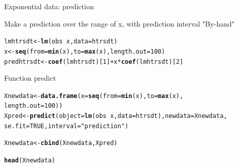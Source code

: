 \documentclass[10pt]{beamer}\usepackage[]{graphicx}\usepackage[]{color}
\makeatletter
\newcommand{\hlnum}[1]{\textcolor[rgb]{0.686,0.059,0.569}{#1}}%
\newcommand{\hlstr}[1]{\textcolor[rgb]{0.192,0.494,0.8}{#1}}%
\newcommand{\hlopt}[1]{\textcolor[rgb]{0,0,0}{#1}}%
\newcommand{\hlstd}[1]{\textcolor[rgb]{0.345,0.345,0.345}{#1}}%
\newcommand{\hlkwb}[1]{\textcolor[rgb]{0.69,0.353,0.396}{#1}}%
\newcommand{\hlkwc}[1]{\textcolor[rgb]{0.333,0.667,0.333}{#1}}%
\newcommand{\hlkwd}[1]{\textcolor[rgb]{0.737,0.353,0.396}{\textbf{#1}}}%
\newenvironment{kframe}{%
 \def\at@end@of@kframe{}%
 \ifinner\ifhmode%
  \def\at@end@of@kframe{\end{minipage}}%
  \begin{minipage}{\columnwidth}%
 \fi\fi%
 \def\FrameCommand##1{\hskip\@totalleftmargin \hskip-\fboxsep
 \colorbox{shadecolor}{##1}\hskip-\fboxsep
     \hskip-\linewidth \hskip-\@totalleftmargin \hskip\columnwidth}%
 \MakeFramed {\advance\hsize-\width
   \@totalleftmargin\z@ \linewidth\hsize
   \@setminipage}}%
 {\par\unskip\endMakeFramed%
 \at@end@of@kframe}
\newenvironment{knitrout}{}{} %
\makeatother
\begin{document}
\begin{frame}[fragile]{Exponential data: prediction}

Make a prediction over the range of x, with prediction interval
\pause
"By-hand"
\begin{knitrout}\small
{}\color{fgcolor}\begin{kframe}
\begin{alltt}
\hlstd{lmhtrsdt} \hlkwb{<-} \hlkwd{lm}\hlstd{(obs} \hlopt{~} \hlstd{x,} \hlkwc{data}\hlstd{=htrsdt)}
\hlstd{x} \hlkwb{<-} \hlkwd{seq}\hlstd{(}\hlkwc{from}\hlstd{=}\hlkwd{min}\hlstd{(x),} \hlkwc{to}\hlstd{=}\hlkwd{max}\hlstd{(x),} \hlkwc{length.out} \hlstd{=} \hlnum{100}\hlstd{)}
\hlstd{predhtrsdt} \hlkwb{<-} \hlkwd{coef}\hlstd{(lmhtrsdt)[}\hlnum{1}\hlstd{]} \hlopt{+} \hlstd{x} \hlopt{*} \hlkwd{coef}\hlstd{(lmhtrsdt)[}\hlnum{2}\hlstd{]}
\end{alltt}
\end{kframe}
\end{knitrout}

\pause
Function predict
\begin{knitrout}\small
{}\color{fgcolor}\begin{kframe}
\begin{alltt}
\hlstd{Xnewdata} \hlkwb{<-} \hlkwd{data.frame}\hlstd{(}\hlkwc{x}\hlstd{=}\hlkwd{seq}\hlstd{(}\hlkwc{from}\hlstd{=}\hlkwd{min}\hlstd{(x),} \hlkwc{to}\hlstd{=}\hlkwd{max}\hlstd{(x),}
                             \hlkwc{length.out} \hlstd{=} \hlnum{100}\hlstd{))}
\hlstd{Xpred} \hlkwb{<-} \hlkwd{predict}\hlstd{(}\hlkwc{object} \hlstd{=}  \hlkwd{lm}\hlstd{(obs} \hlopt{~} \hlstd{x,} \hlkwc{data}\hlstd{=htrsdt),} \hlkwc{newdata} \hlstd{= Xnewdata,}
                 \hlkwc{se.fit} \hlstd{=} \hlnum{TRUE}\hlstd{,} \hlkwc{interval} \hlstd{=} \hlstr{"prediction"}\hlstd{)}
\end{alltt}
\end{kframe}
\end{knitrout}
\pause
\begin{knitrout}\small
{}\color{fgcolor}\begin{kframe}
\begin{alltt}
\hlstd{Xnewdata} \hlkwb{<-} \hlkwd{cbind}\hlstd{(Xnewdata, Xpred)}
\end{alltt}
\end{kframe}
\end{knitrout}

\begin{knitrout}\small
{}\color{fgcolor}\begin{kframe}
\begin{alltt}
\hlkwd{head}\hlstd{(Xnewdata)}
\end{alltt}
\end{kframe}
\end{knitrout}

\end{frame}
\end{document}
